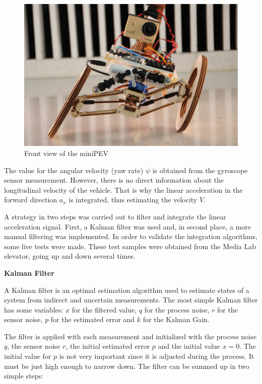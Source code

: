 \begin{figure}[h!]
	\includegraphics[width=1.0\linewidth]{figs/04/IMG0956}
	\caption{Front view of the miniPEV}
	\label{minipev2}
\end{figure}

\newpage
The value for the angular velocity (yaw rate) $\dot{\psi}$ is obtained from the gyroscope sensor measurement. However, there is no direct information about the longitudinal velocity of the vehicle.  That is why the linear acceleration in the forward direction $a_{x}$ is integrated, thus estimating the velocity $V$.

A strategy in two steps was carried out to filter and integrate the linear acceleration signal. First, a Kalman filter was used and, in second place, a more manual filtering was implemented. In order to validate the integration algorithms, some live tests were made. These test samples were obtained from the Media Lab elevator, going up and down several times.

\newpage
\textbf{Kalman Filter}

A Kalman filter is an optimal estimation algorithm used to estimate states of a system from indirect and uncertain measurements. The most simple Kalman filter has some variables: $x$ for the filtered value, $q$ for the process noise, $r$ for the sensor noise, $p$ for the estimated error and $k$ for the Kalman Gain. 

The filter is applied with each measurement and initialized with the process noise $q$, the sensor noise $r$, the initial estimated error $p$ and the initial value $x=0$. The initial value for $p$ is not very important since it is adjusted during the process. It must be just high enough to narrow down. The filter can be summed up in two simple steps:


